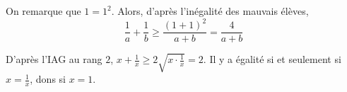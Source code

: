 \begin{sol}
On remarque que $1 = 1^2$. Alors, d'après l'inégalité des mauvais élèves,
$$\frac 1a + \frac 1b \ge \frac{(1+1)^2}{a+b} = \frac 4{a+b}$$
\end{sol}

\begin{sol}
D'après l'IAG au rang $2$, $x + \frac 1x \ge 2 \sqrt{x \cdot \frac 1x} = 2$. Il y a égalité si et seulement si $x = \frac 1x$, dons si $x = 1$.
\end{sol}
